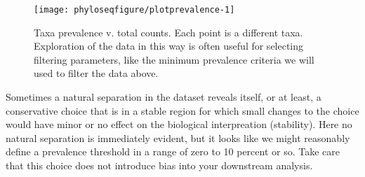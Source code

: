 \begin{figure}[H]
\begin{knitrout}
\color{fgcolor}

{\centering \texttt{[image: phyloseqfigure/plotprevalence-1]} 

}



\end{knitrout}
\caption{Taxa prevalence v. total counts. Each point is a different taxa. Exploration of the data in this way is often useful for selecting filtering parameters, like the minimum prevalence criteria we will used to filter the data above.}
\end{figure}
Sometimes a natural separation in the dataset reveals itself,
or at least, a conservative choice that is in a stable region
for which small changes to the choice would have
minor or no effect on the biological interpreation (stability).
Here no natural separation is immediately evident,
but it looks like we might reasonably define a prevalence threshold
in a range of zero to 10 percent or so.
Take care that this choice does not introduce bias
into your downstream analysis.

